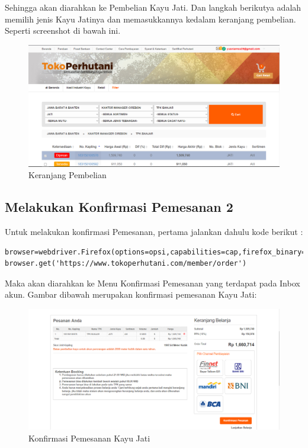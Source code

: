 Sehingga akan diarahkan ke Pembelian Kayu Jati. Dan langkah berikutya adalah memilih jenis Kayu Jatinya dan memasukkannya kedalam keranjang pembelian. Seperti screenshot di bawah ini.
\begin{figure}[h]
	\centering
	\includegraphics[scale=0.25]{figures/T5_cart}
	\caption{Keranjang Pembelian}
\end{figure}

\newpage
\subsection {Melakukan Konfirmasi Pemesanan 2}
Untuk melakukan konfirmasi Pemesanan, pertama jalankan dahulu kode berikut :
\begin{verbatim}
browser=webdriver.Firefox(options=opsi,capabilities=cap,firefox_binary=binary)
browser.get('https://www.tokoperhutani.com/member/order')
\end{verbatim}

Maka akan diarahkan ke Menu Konfirmasi Pemesanan yang terdapat pada Inbox akun.
Gambar dibawah merupakan konfirmasi pemesanan Kayu Jati:
\begin{figure}[h]
	\centering
	\includegraphics[scale=0.25]{figures/T6_1}
	\caption{Konfirmasi Pemesanan Kayu Jati}
\end{figure}

